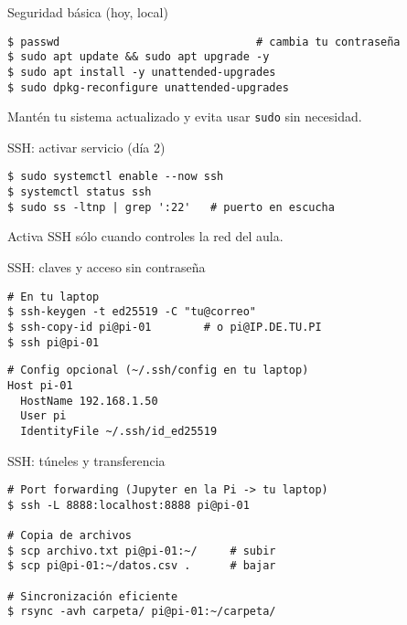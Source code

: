 \documentclass[aspectratio=169,professionalfonts]{beamer}
\begin{document}
\begin{frame}[fragile]{Seguridad básica (hoy, local)}
\begin{verbatim}
$ passwd                              # cambia tu contraseña
$ sudo apt update && sudo apt upgrade -y
$ sudo apt install -y unattended-upgrades
$ sudo dpkg-reconfigure unattended-upgrades
\end{verbatim}
\begin{infobox}
Mantén tu sistema actualizado y evita usar \texttt{sudo} sin necesidad.
\end{infobox}
\end{frame}

\begin{frame}[fragile]{SSH: activar servicio (día 2)}
\begin{verbatim}
$ sudo systemctl enable --now ssh
$ systemctl status ssh
$ sudo ss -ltnp | grep ':22'   # puerto en escucha
\end{verbatim}
\begin{warnbox}
Activa SSH sólo cuando controles la red del aula.
\end{warnbox}
\end{frame}

\begin{frame}[fragile]{SSH: claves y acceso sin contraseña}
\begin{verbatim}
# En tu laptop
$ ssh-keygen -t ed25519 -C "tu@correo"
$ ssh-copy-id pi@pi-01        # o pi@IP.DE.TU.PI
$ ssh pi@pi-01
\end{verbatim}
\begin{verbatim}
# Config opcional (~/.ssh/config en tu laptop)
Host pi-01
  HostName 192.168.1.50
  User pi
  IdentityFile ~/.ssh/id_ed25519
\end{verbatim}
\end{frame}

\begin{frame}[fragile]{SSH: túneles y transferencia}
\begin{verbatim}
# Port forwarding (Jupyter en la Pi -> tu laptop)
$ ssh -L 8888:localhost:8888 pi@pi-01

# Copia de archivos
$ scp archivo.txt pi@pi-01:~/     # subir
$ scp pi@pi-01:~/datos.csv .      # bajar

# Sincronización eficiente
$ rsync -avh carpeta/ pi@pi-01:~/carpeta/
\end{verbatim}
\end{frame}
\end{document}

